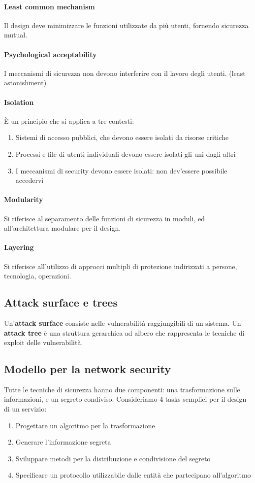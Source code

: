 \documentclass[11pt]{article}
\begin{document}
\paragraph{Least common mechanism} Il design deve minimizzare le funzioni utilizzate da più utenti, fornendo sicurezza mutual.
\paragraph{Psychological acceptability} I meccanismi di sicurezza non devono interferire con il lavoro degli utenti. (least astonishment)
\paragraph{Isolation} È un principio che si applica a tre contesti: 
\begin{enumerate}
    \item Sistemi di accesso pubblici, che devono essere isolati da risorse critiche
    \item Processi e file di utenti individuali devono essere isolati gli uni dagli altri 
    \item I meccanismi di security devono essere isolati: non dev'essere possibile accedervi
\end{enumerate} 
\paragraph{Modularity} Si riferisce al separamento delle funzioni di sicurezza in moduli, ed all'architettura modulare per il design.
\paragraph{Layering} Si riferisce all'utilizzo di approcci multipli di protezione indirizzati a persone, tecnologia, operazioni.
\subsection{Attack surface e trees}
Un'\textbf{attack surface} consiste nelle vulnerabilità raggiungibili di un sistema. Un \textbf{attack tree} è una struttura gerarchica ad albero che rappresenta le tecniche di exploit delle vulnerabilità. 
\subsection{Modello per la network security}
Tutte le tecniche di sicurezza hanno due componenti: una trasformazione sulle informazioni, e un segreto condiviso. Consideriamo 4 tasks semplici per il design di un servizio:
\begin{enumerate}
    \item Progettare un algoritmo per la trasformazione 
    \item Generare l'informazione segreta
    \item Sviluppare metodi per la distribuzione e condivisione del segreto
    \item Specificare un protocollo utilizzabile dalle entità che partecipano all'algoritmo
\end{enumerate}
\end{document}
